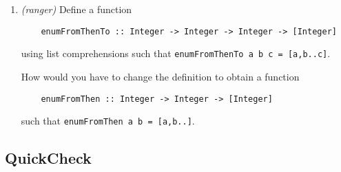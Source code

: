 \documentclass{article}
\begin{document}
\begin{enumerate}
\item \textit{(ranger)} Define a function
\begin{verbatim}
    enumFromThenTo :: Integer -> Integer -> Integer -> [Integer]
\end{verbatim}
using list comprehensions such that \verb|enumFromThenTo a b c = [a,b..c]|. \par
How would you have to change the definition to obtain a function
\begin{verbatim}
    enumFromThen :: Integer -> Integer -> [Integer]
\end{verbatim}
such that \verb|enumFromThen a b = [a,b..]|.
\end{enumerate}

\subsection{QuickCheck}
\end{document}
